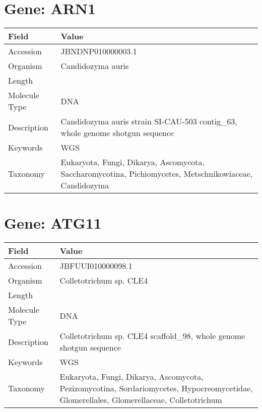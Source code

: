 \documentclass[10pt]{article}
\begin{document}
\section*{Gene: ARN1}
{\footnotesize
\begin{longtable}{>{\raggedright\arraybackslash}p{4.5cm} >{\raggedright\arraybackslash}p{11.5cm}}
\textbf{Field} & \textbf{Value} \\
\hline
Accession & JBNDNP010000003.1 \\
Organism & Candidozyma auris \\
Length & 776716 \\
Molecule Type & DNA \\
Description & Candidozyma auris strain SI-CAU-503 contig\_63, whole genome shotgun sequence \\
Keywords & WGS \\
Taxonomy & Eukaryota, Fungi, Dikarya, Ascomycota, Saccharomycotina, Pichiomycetes, Metschnikowiaceae, Candidozyma \\
\end{longtable}
}


\section*{Gene: ATG11}
{\footnotesize
\begin{longtable}{>{\raggedright\arraybackslash}p{4.5cm} >{\raggedright\arraybackslash}p{11.5cm}}
\textbf{Field} & \textbf{Value} \\
\hline
Accession & JBFUUI010000098.1 \\
Organism & Colletotrichum sp. CLE4 \\
Length & 135609 \\
Molecule Type & DNA \\
Description & Colletotrichum sp. CLE4 scaffold\_98, whole genome shotgun sequence \\
Keywords & WGS \\
Taxonomy & Eukaryota, Fungi, Dikarya, Ascomycota, Pezizomycotina, Sordariomycetes, Hypocreomycetidae, Glomerellales, Glomerellaceae, Colletotrichum \\
\end{longtable}
}
\end{document}
